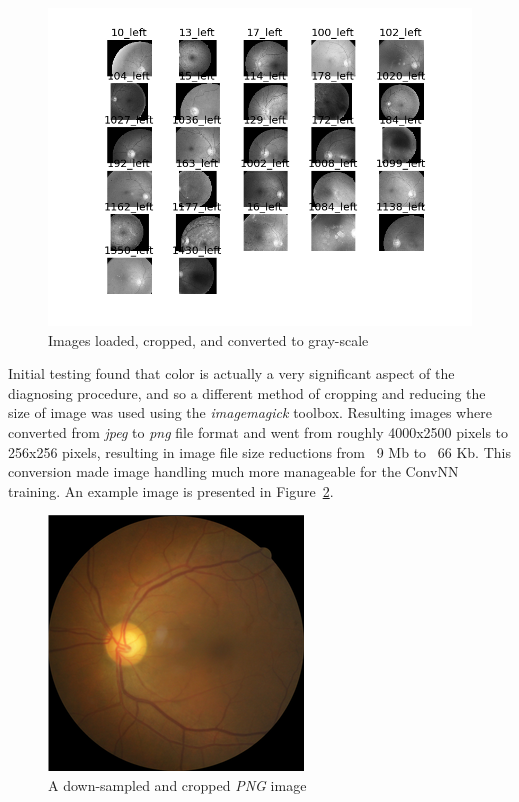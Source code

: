 \documentclass[letterpaper,12pt]{article}
\newcommand{\figref}[1]{Figure~\ref{#1}}
\begin{document}
\begin{figure}[htbp]
\begin{center}
\includegraphics[scale=0.5]{images/lInitialImages_gray.png}
\caption{Images loaded, cropped, and converted to gray-scale}
\label{loaded}
\end{center}
\end{figure}

Initial testing found that color is actually a very significant aspect of the diagnosing procedure, and so a different method of cropping and reducing the size of image was used using the \textit{imagemagick} toolbox. Resulting images where converted from \textit{jpeg} to \textit{png} file format and went from roughly 4000x2500 pixels to 256x256 pixels, resulting in image file size reductions from ~9 Mb to ~66 Kb. This conversion made image handling much more manageable for the ConvNN training. An example image is presented in \figref{png}.

\begin{figure}[htbp]
\begin{center}
\includegraphics[scale=0.75]{images/png_format.png}
\caption{A down-sampled and cropped \textit{PNG} image} 
\label{png}
\end{center}
\end{figure}
\end{document}
